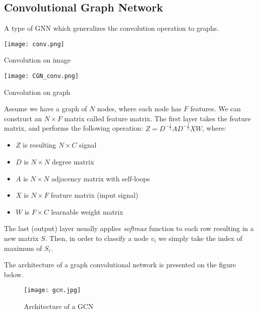 \subsection{Convolutional Graph Network}
\begin{frame}[allowframebreaks]{\subsecname}
   A type of GNN which generalizes the convolution operation to graphs.

   \begin{multicols}{2}
      \centering
      \texttt{[image: conv.png]}
      \caption{Convolution on image}
      \hfill
      \centering
      \texttt{[image: CGN\_conv.png]}
      \caption{Convolution on graph}
   \end{multicols}
   
   \framebreak

   Assume we have a graph of $N$ nodes, where each node has $F$ features.
   We can construct an $N \times F$ matrix called feature matrix.
   The first layer takes the feature matrix, and performs the following operation: $Z = D^{-\frac{1}{2}} A D^{-\frac{1}{2}} X W$, where:
   \begin{itemize}
       \item $Z$ is resulting $N \times C$ signal
       \item $D$ is $N \times N$ degree matrix
       \item $A$ is $N \times N$ adjacency matrix with self-loops
       \item $X$ is $N \times F$ feature matrix (input signal)
       \item $W$ is $F \times C$ learnable weight matrix
   \end{itemize}

   The last (output) layer usually applies \emph{softmax} function to each row resulting in a new matrix $S$.
   Then, in order to classify a node $v_i$ we simply take the index of maximum of $S_i$.
   
   \framebreak

   The architecture of a graph convolutional network is presented on the figure below.
   \begin{figure}[h]
       \centering
       \texttt{[image: gcn.jpg]}
       \caption{Architecture of a GCN}
   \end{figure}
\end{frame}

